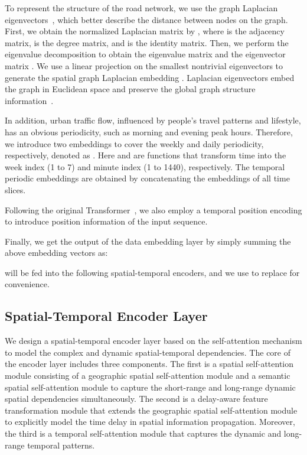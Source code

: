 \documentclass[letterpaper]{article} \usepackage{aaai23}  \usepackage{times}  \usepackage{helvet}  \usepackage{courier}  \usepackage[hyphens]{url}  \usepackage{graphicx} \urlstyle{rm} \def\UrlFont{\rm}  \usepackage{natbib}  \usepackage{caption} \frenchspacing  \setlength{\pdfpagewidth}{8.5in} \setlength{\pdfpageheight}{11in} \usepackage{algorithm}
\begin{document}
To represent the structure of the road network, we use the graph Laplacian eigenvectors~\cite{lap}, which better describe the distance between nodes on the graph. First, we obtain the normalized Laplacian matrix by , where  is the adjacency matrix,  is the degree matrix, and  is the identity matrix. Then, we perform the eigenvalue decomposition  to obtain the eigenvalue matrix  and the eigenvector matrix . We use a linear projection on the  smallest nontrivial eigenvectors to generate the spatial graph Laplacian embedding . Laplacian eigenvectors embed the graph in Euclidean space and preserve the global graph structure information~\cite{lap2}.



In addition, urban traffic flow, influenced by people's travel patterns and lifestyle, has an obvious periodicity, such as morning and evening peak hours. Therefore, we introduce two embeddings to cover the weekly and daily periodicity, respectively, denoted as . Here  and  are functions that transform time  into the week index (1 to 7) and minute index (1 to 1440), respectively. The temporal periodic embeddings  are obtained by concatenating the embeddings of all  time slices.

Following the original Transformer~\cite{transformer}, we also employ a temporal position encoding  to introduce position information of the input sequence.


Finally, we get the output of the data embedding layer by simply summing the above embedding vectors as:

 will be fed into the following spatial-temporal encoders, and we use  to replace  for convenience.

\subsection{Spatial-Temporal Encoder Layer}



We design a spatial-temporal encoder layer based on the self-attention mechanism to model the complex and dynamic spatial-temporal dependencies. The core of the encoder layer includes three components. The first is a spatial self-attention module consisting of a geographic spatial self-attention module and a semantic spatial self-attention module to capture the short-range and long-range dynamic spatial dependencies simultaneously. The second is a delay-aware feature transformation module that extends the geographic spatial self-attention module to explicitly model the time delay in spatial information propagation. Moreover, the third is a temporal self-attention module that captures the dynamic and long-range temporal patterns.
\end{document}
